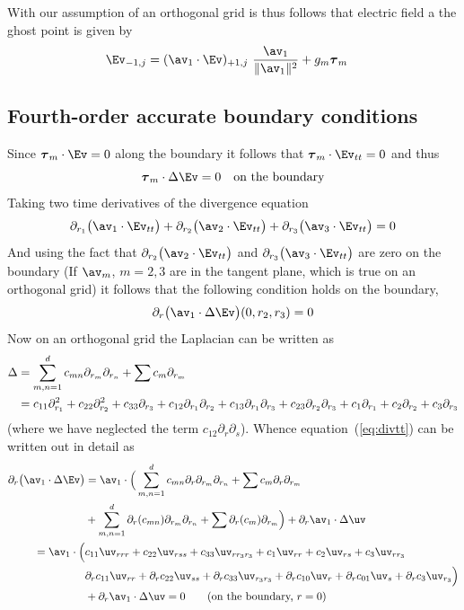 \documentclass[10pt]{article}
\newcommand{\rc}{{r_3}}%
\begin{document}
With our assumption of an orthogonal grid is thus follows that electric field a the 
ghost point is given by
\begin{align*}
\Ev_{-1,j} &= (\av_1\cdot\Ev)_{+1,j} ~{\av_1\over \| \av_1 \|^2} + g_m \tauv_m
\end{align*}


\subsection{Fourth-order accurate boundary conditions}

Since $\tauv_m\cdot \Ev=0$ along the boundary it follows that $\tauv_m\cdot \Ev_{tt}=0$ and thus
\[
   \tauv_m \cdot\Delta \Ev = 0 \quad\mbox{on the boundary}
\]
Taking two time derivatives of the divergence equation
\[
  \pra\big(\av_1\cdot \Ev_{tt} \big) + \prb\big(\av_2\cdot \Ev_{tt}\big) + \prc\big(\av_3\cdot \Ev_{tt}  \big) =0 
\]
And using the fact that $\prb\big(\av_2\cdot \Ev_{tt}\big)$ and 
$\prc\big(\av_3\cdot \Ev_{tt}\big)$ are zero on the boundary
(If $\av_m$, $m=2,3$ are in the tangent plane, which is true on an orthogonal grid) it follows that
the following condition holds on the boundary,
\begin{equation}
  \partial_r\big(\av_1\cdot \Delta\Ev \big) (0,r_2,r_3) =0   \label{eq:divtt}
\end{equation}
Now on an orthogonal grid the Laplacian can be written as
\begin{align}
   \Delta  &= \sum_{m,n=1}^d  c_{mn} \partial_{r_m}\partial_{r_n} + \sum c_m \partial_{r_m} \\
           &= c_{11} \partial_{r_1}^2 + c_{22}\partial_{r_2}^2 + c_{33}\partial_{r_3}  + 
              c_{12} \partial_{r_1}\partial_{r_2} + c_{13}\partial_{r_1}\partial_{r_3} + c_{23}\partial_{r_2}\partial_{r_3}  +
              c_{1} \partial_{r_1} + c_{2} \partial_{r_2}+ c_{3} \partial_{r_3}
\end{align}
(where we have neglected the term $c_{12}\partial_r\partial_s$).
Whence equation~(\ref{eq:divtt}) can be written out in detail as
\begin{align}
   \partial_r\big(\av_1\cdot \Delta\Ev \big) &= 
  \av_1\cdot\Big( \sum_{m,n=1}^d  c_{mn} \partial_r\partial_{r_m}\partial_{r_n} 
                   + \sum c_m \partial_r\partial_{r_m} \label{eq:DrADotuv} \\
 ~~~&+ \sum_{m,n=1}^d  \partial_r(c_{mn}) \partial_{r_m}\partial_{r_n} + \sum \partial_r(c_m) \partial_{r_m} \Big) 
   +  \partial_r\av_1\cdot \Delta\uv \\
=  \av_1\cdot\Big( &c_{11} \uv_{rrr} + c_{22}\uv_{rss} + c_{33}\uv_{r\rc\rc} 
             + c_{1}\uv_{rr} + c_{2}\uv_{rs} + c_{3}\uv_{r\rc}  \label{eq:divtte}\\
                  &\partial_r c_{11} \uv_{rr} + \partial_r c_{22}\uv_{ss} + \partial_r c_{33}\uv_{\rc\rc} 
                   + \partial_r c_{10}\uv_{r} + \partial_r c_{01}\uv_{s}+ \partial_r c_{3}\uv_{\rc} \Big) \\
   &  + \partial_r\av_1\cdot \Delta\uv = 0 \qquad\mbox{(on the boundary, $r=0$)}
\end{align}
\end{document}
